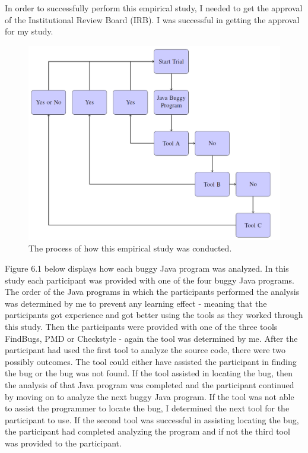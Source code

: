 In order to successfully perform this empirical study, I needed to get the approval of the Institutional Review Board (IRB). I was successful in getting the approval for my study. 

\begin{figure}[h]
	\begin{center}
		\includegraphics[width=1.15\textwidth]{Methodology.png}
	\end{center}
	\caption{The process of how this empirical study was conducted.}
	\label{fig:metholody}
\end{figure}

Figure 6.1 below displays how each buggy Java program was analyzed. In this study each participant was provided with one of the four buggy Java programs. The order of the Java programs in which the participants performed the analysis was determined by me to prevent any learning effect - meaning that the participants got experience and got better using the tools as they worked through this study. Then the participants were provided with one of the three tools FindBugs, PMD or Checkstyle  - again the tool was determined by me. After the participant had used the first tool to analyze the source code, there were two possibly outcomes. The tool could either have assisted the participant in finding the bug or the bug was not found. If the tool assisted in locating the bug, then the analysis of that Java program was completed and the participant continued by moving on to analyze the next buggy Java program. If the tool was not able to assist the programmer to locate the bug, I determined the next tool for the participant to use. If the second tool was successful in assisting locating the bug, the participant had completed analyzing the program and if not the third tool was provided to the participant. 

